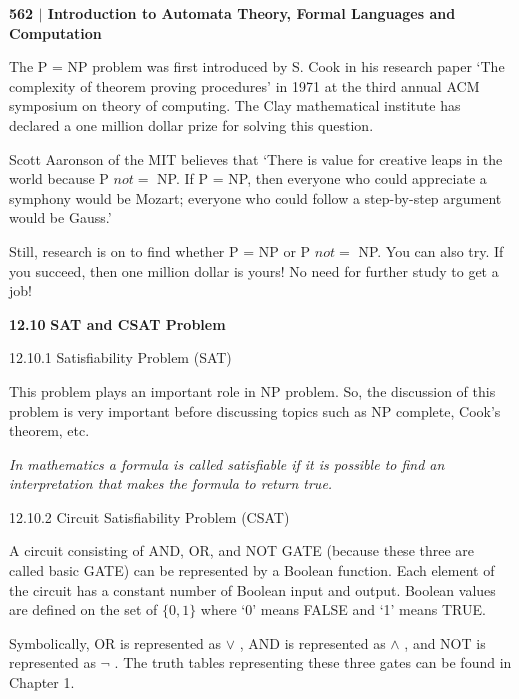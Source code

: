 \documentclass[10pt,a4paper]{book}
\begin{document}
\small

\begin{flushleft}
  \textsf{\textbf{562 $|$ Introduction to Automata Theory, Formal Languages and Computation}}
\end{flushleft}

The P = NP problem was first introduced by S. Cook in his research paper ‘The complexity of theorem proving procedures’ in 1971 at the third annual ACM symposium on theory of computing. The Clay mathematical institute has declared a one million dollar prize for solving this question.

Scott Aaronson of the MIT believes that ‘There is value for creative leaps in the world because
P $not=$ NP. If P = NP, then everyone who could appreciate a symphony would be Mozart; everyone who
could follow a step-by-step argument would be Gauss.’

Still, research is on to find whether P = NP or P $not=$ NP. You can also try. If you succeed, then one million dollar is yours! No need for further study to get a job!

\qquad

\begin{flushleft}
  \large \textbf{12.10} \; \textsf{\textbf{SAT and CSAT Problem}}

  12.10.1 \; \textsf{Satisfiability Problem (SAT)}
\end{flushleft}

\!\!\!\!\!\!\!\!\!\!\!This problem plays an important role in NP problem. So, the discussion of this problem is very important
before discussing topics such as NP complete, Cook’s theorem, etc.

\textsl{In mathematics a formula is called satisfiable if it is possible to find an interpretation that makes the formula to return true.}

\begin{flushleft}
  \large 12.10.2 \; \textsf{Circuit Satisfiability Problem (CSAT)}
\end{flushleft}

\!\!\!\!\!\!\!\!\!\!\!A circuit consisting of AND, OR, and NOT GATE (because these three are called basic GATE) can be represented by a Boolean function. Each element of the circuit has a constant number of Boolean input and output. Boolean values are defined on the set of $\{0, 1\}$ where ‘0’ means FALSE and ‘1’ means TRUE.

Symbolically, OR is represented as $\vee$ , AND is represented as $\wedge$ , and NOT is represented as $\neg$ . The truth tables representing these three gates can be found in Chapter 1.
\end{document}
